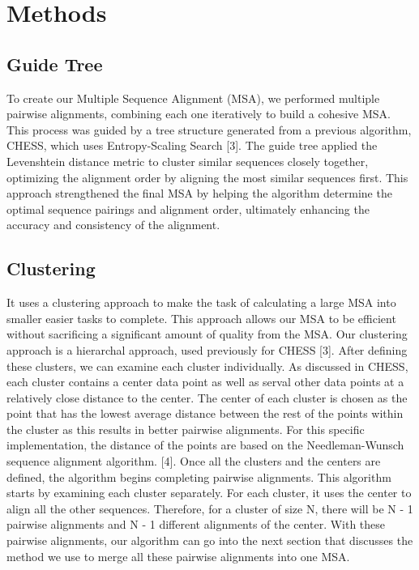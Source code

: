 \section{Methods}
\label{sec:methods}
\subsection{Guide Tree}
To create our Multiple Sequence Alignment (MSA), we performed multiple pairwise alignments, combining each one iteratively to build a cohesive MSA. This process was guided by a tree structure generated from a previous algorithm, CHESS, which uses Entropy-Scaling Search [3]. The guide tree applied the Levenshtein distance metric to cluster similar sequences closely together, optimizing the alignment order by aligning the most similar sequences first. This approach strengthened the final MSA by helping the algorithm determine the optimal sequence pairings and alignment order, ultimately enhancing the accuracy and consistency of the alignment.
\subsection{Clustering}
It uses a clustering approach to make the task of calculating a large MSA into smaller easier tasks to complete. This approach allows our MSA to be efficient without sacrificing a significant amount of quality from the MSA. Our clustering approach is a hierarchal approach, used previously for CHESS [3]. After defining these clusters, we can examine each cluster individually. As discussed in CHESS, each cluster contains a center data point as well as serval other data points at a relatively close distance to the center. The center of each cluster is chosen as the point that has the lowest average distance between the rest of the points within the cluster as this results in better pairwise alignments. For this specific implementation, the distance of the points are based on the Needleman-Wunsch sequence alignment algorithm. [4]. Once all the clusters and the centers are defined, the algorithm begins completing pairwise alignments. This algorithm starts by examining each cluster separately. For each cluster, it uses the center to align all the other sequences. Therefore, for a cluster of size N, there will be N - 1 pairwise alignments and N - 1 different alignments of the center. With these pairwise alignments, our algorithm can go into the next section that discusses the method we use to merge all these pairwise alignments into one MSA.
